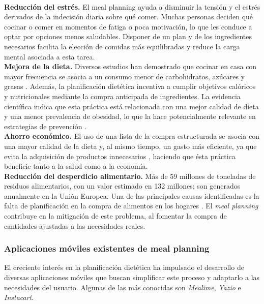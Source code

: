 \documentclass[12pt,a4paper]{report} %
\begin{document}
	\\
	\textbf{Reducción del estrés.} El meal planning ayuda a disminuir la tensión y el estrés derivados de la indecisión diaria sobre qué comer. Muchas personas deciden qué cocinar o comer en momentos de fatiga o poca motivación, lo que les conduce a optar por opciones menos saludables. Disponer de un plan y de los ingredientes necesarios facilita la elección de comidas más equilibradas y reduce la carga mental asociada a esta tarea.
	\\
	\textbf{Mejora de la dieta.} Diversos estudios han demostrado que cocinar en casa con mayor frecuencia se asocia a un consumo menor de carbohidratos, azúcares y grasas \cite{johnshopkins2014}. Además, la planificación dietética incentiva a cumplir objetivos calóricos y nutricionales mediante la compra anticipada de ingredientes. La evidencia científica indica que esta práctica está relacionada con una mejor calidad de dieta y una menor prevalencia de obesidad, lo que la hace potencialmente relevante en estrategias de prevención \cite{ducrot2017}.
	\\
	\textbf{Ahorro económico.} El uso de una lista de la compra estructurada se asocia con una mayor calidad de la dieta y, al mismo tiempo, un gasto más eficiente, ya que evita la adquisición de productos innecesarios \cite{jneb2017}, haciendo que ésta práctica beneficie tanto a la salud como a la economía.
	\\
	\textbf{Reducción del desperdicio alimentario.} Más de 59 millones de toneladas de residuos alimentarios, con un valor estimado en 132 millones; son generados anualmente en la Unión Europea. Una de las principales causas identificadas es la falta de planificación en la compra de alimentos en los hogares \cite{europeancommission2020}. El \textit{meal planning} contribuye en la mitigación de este problema, al fomentar la compra de cantidades ajustadas a las necesidades reales.
	
	
	\subsubsection*{Aplicaciones móviles existentes de meal planning}
	El creciente interés en la planificación dietética ha impulsado el desarrollo de diversas aplicaciones móviles que buscan simplificar este proceso y adaptarlo a las necesidades del usuario. Algunas de las más conocidas son \textit{Mealime}, \textit{Yazio} e \textit{Instacart}.\\
	
\end{document}
